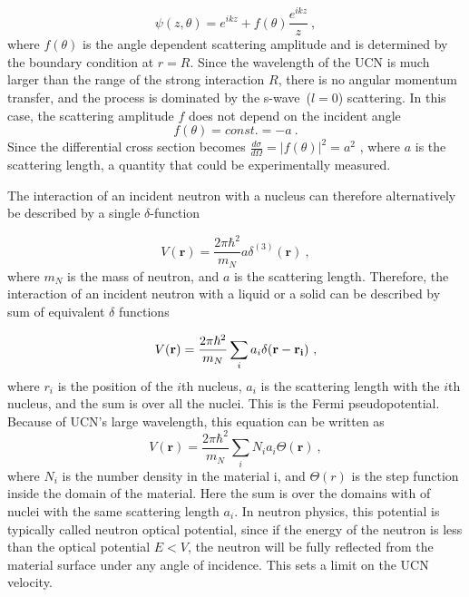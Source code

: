 \begin{equation}
  \psi(z, \theta) = e^{ikz} + f(\theta)\frac{e^{ikz}}{z}~,
\end{equation}
where $f(\theta)$ is the angle dependent scattering amplitude and is
determined by the boundary condition at $r = R$. Since the wavelength
of the UCN is much larger than the range of the strong interaction
$R$, there is no angular momentum transfer, and the process is
dominated by the s-wave~($l = 0$) scattering. In this case, the
scattering amplitude $f$ does not depend on the incident angle
\begin{equation}
f(\theta) = const. = -a~.
\end{equation}
Since the differential cross section becomes
$\frac{d\sigma}{d\Omega} = |f(\theta)|^2 = a^2$ , where $a$ is the
scattering length, a quantity that could be experimentally measured.

The interaction of an incident neutron with a nucleus can therefore
alternatively be described by a single $\delta$-function

\begin{equation}
  V(\textbf{r}) = \frac{2 \pi \hbar^2}{m_N} a \delta^{(3)}(\textbf{r})~,
\end{equation}
where $m_N$ is the mass of neutron, and $a$ is the scattering
length. Therefore, the interaction of an incident neutron with a
liquid or a solid can be described by sum of equivalent $\delta$
functions

\begin{equation}
  \label{eqn:vFermi}
  V(\textbf{r}) = \frac{2\pi \hbar^2}{m_N} \sum_i a_i \delta (\bf{r} - \bf{r_i})~,
\end{equation}
where $r_i$ is the position of the $i$th nucleus, $a_i$ is the
scattering length with the $i$th nucleus, and the sum is over all the
nuclei. This is the Fermi pseudopotential. Because of UCN's large
wavelength, this equation can be written as
\begin{equation}
  V(\textbf{r}) = \frac{2\pi \hbar^2}{m_N}\sum_i N_ia_i\Theta(\textbf{r})~,
\end{equation}
where $N_i$ is the number density in the material i, and $\Theta(r)$
is the step function inside the domain of the material. Here the sum
is over the domains with of nuclei with the same scattering length
$a_i$. In neutron physics, this potential is typically called neutron
optical potential, since if the energy of the neutron is less than the
optical potential $E < V$, the neutron will be fully reflected from
the material surface under any angle of incidence. This sets a limit
on the UCN velocity.

